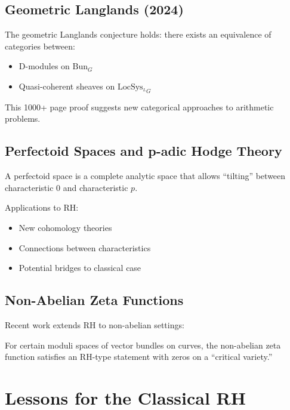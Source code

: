 \subsection{Geometric Langlands (2024)}

\begin{theorem}
The geometric Langlands conjecture holds: there exists an equivalence of categories between:
\begin{itemize}
\item D-modules on $\text{Bun}_G$
\item Quasi-coherent sheaves on $\text{LocSys}_{{}^L G}$
\end{itemize}
\end{theorem}

This 1000+ page proof suggests new categorical approaches to arithmetic problems.

\subsection{Perfectoid Spaces and p-adic Hodge Theory}

\begin{definition}[Scholze]
A perfectoid space is a complete analytic space that allows ``tilting'' between characteristic 0 and characteristic $p$.
\end{definition}

Applications to RH:
\begin{itemize}
\item New cohomology theories
\item Connections between characteristics
\item Potential bridges to classical case
\end{itemize}

\subsection{Non-Abelian Zeta Functions}

Recent work extends RH to non-abelian settings:

\begin{theorem}[2022]
For certain moduli spaces of vector bundles on curves, the non-abelian zeta function satisfies an RH-type statement with zeros on a ``critical variety.''
\end{theorem}

\section{Lessons for the Classical RH}
\label{sec:lessons}

